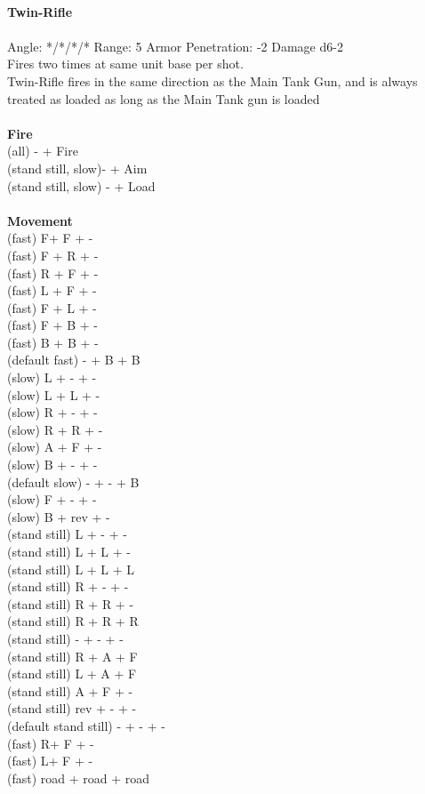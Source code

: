 \ \\
{\bf Twin-Rifle } \\
\ \\
Angle: */*/*/* Range: 5 Armor Penetration: -2 Damage d6-2 \\
\indent Fires two times at same unit base per shot.\\Twin-Rifle fires in the same direction as the Main Tank Gun, and is always treated as loaded as long as the Main Tank gun is loaded \\





\ \\ {\bf Fire } \\
(all) - + Fire \\
(stand still, slow)- + Aim \\
(stand still, slow) - + Load \\
\ \\ {\bf Movement } \\
(fast) F+ F + - \\
(fast) F + R + - \\
(fast) R + F + - \\
(fast) L + F + -  \\
(fast) F + L + - \\
(fast) F + B + - \\
(fast) B + B + - \\
(default fast) - + B + B \\
(slow) L + - + - \\
(slow) L + L + - \\
(slow) R + - + - \\
(slow) R + R + - \\
(slow) A + F + - \\
(slow) B + - + - \\
(default slow) - + - + B \\
(slow) F + - + - \\
(slow) B + rev + - \\
(stand still) L + - + - \\
(stand still) L + L + - \\
(stand still) L + L + L \\
(stand still) R + - + - \\
(stand still) R + R + - \\
(stand still) R + R + R \\
(stand still) - + - + - \\
(stand still) R + A + F \\
(stand still) L + A + F \\
(stand still) A + F + - \\
(stand still) rev + - + - \\
(default stand still) - + - + - \\
(fast) R+ F + - \\
(fast) L+ F + - \\
(fast) road + road + road \\



